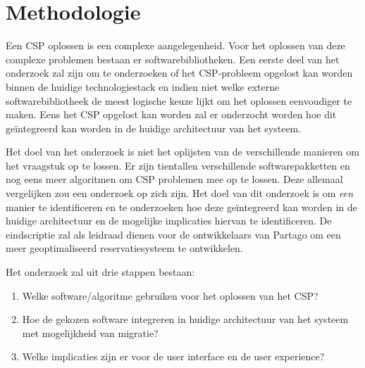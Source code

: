 
\section{Methodologie}
\label{sec:methodologie}
Een CSP oplossen is een complexe aangelegenheid. Voor het oplossen van deze complexe problemen bestaan er softwarebibliotheken. Een eerste deel van het onderzoek zal zijn om te onderzoeken of het CSP-probleem opgelost kan worden binnen de huidige technologiestack en indien niet welke externe softwarebibliotheek de meest logische keuze lijkt om het oplossen eenvoudiger te maken. Eens het CSP opgelost kan worden zal er onderzocht worden hoe dit geïntegreerd kan worden in de huidige architectuur van het systeem. 

Het doel van het onderzoek is niet het oplijsten van de verschillende manieren om het vraagstuk op te lossen. Er zijn tientallen verschillende softwarepakketten en nog eens meer algoritmen om CSP problemen mee op te lossen. Deze allemaal vergelijken zou een onderzoek op zich zijn. Het doel van dit onderzoek is om \textit{een} manier te identificeren en te onderzoeken hoe deze geïntegreerd kan worden in de huidige architectuur en de mogelijke implicaties hiervan te identificeren. De eindscriptie zal als leidraad dienen voor de ontwikkelaars van Partago om een meer geoptimaliseerd reservatiesysteem te ontwikkelen. 

Het onderzoek zal uit drie stappen bestaan:
\begin{enumerate}
	\item Welke software/algoritme gebruiken voor het oplossen van het CSP? 
	\item Hoe de gekozen software integreren in huidige architectuur van het systeem met mogelijkheid van migratie?
	\item Welke implicaties zijn er voor de user interface en de user experience?
\end{enumerate}

